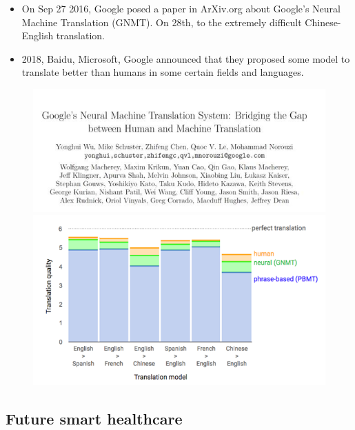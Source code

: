 \begin{itemize}
\item On Sep 27 2016,  Google posed a paper in ArXiv.org about Google's Neural Machine Translation (GNMT). On 28th, to the extremely difficult Chinese-English translation.

\item 2018, Baidu, Microsoft, Google announced that they proposed some model to translate better than humans in some certain fields and languages.
\end{itemize}
\begin{figure}[H]
\centering
\includegraphics[width=\textwidth]{figures/MachineTranslation1}\\
\includegraphics[width=\textwidth]{figures/MachineTranslation2}
\end{figure}




\subsection{Future smart healthcare}

